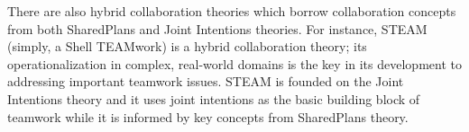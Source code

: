 \documentclass[a4paper, 11pt]{article}
\begin{document}
\begin{small}


There are also hybrid collaboration theories which borrow collaboration
concepts from both SharedPlans and Joint Intentions theories. For instance,
STEAM \cite{tambe:flexible-teamwork} (simply, a Shell TEAMwork) is a hybrid
collaboration theory; its operationalization in complex, real-world domains is
the key in its development to addressing important teamwork issues. STEAM is
founded on the Joint Intentions theory and it uses joint intentions as the basic
building block of teamwork while it is informed by key concepts from SharedPlans
theory.


\end{small}
\end{document}
